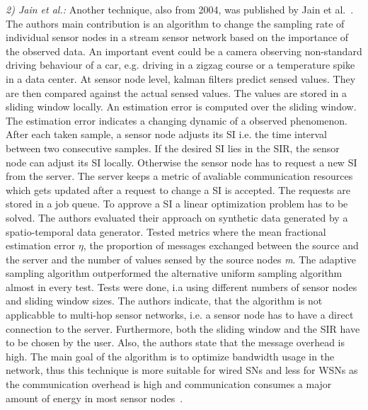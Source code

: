 \textit{2) Jain et al.:}
Another technique, also from 2004, was published by Jain et
al.~\cite{jain2004adaptive}. The authors main contribution is an algorithm to
change the sampling rate of individual sensor nodes in a stream sensor network
based on the importance of the observed data. An important event could be a
camera observing non-standard driving behaviour of a car, e.g. driving in a
zigzag course or a temperature spike in a data center. At sensor node level,
kalman filters predict sensed values. They are then compared against the actual
sensed values. The values are stored in a sliding window locally. An estimation
error is computed over the sliding window. The estimation error indicates a
changing dynamic of a observed phenomenon. After each taken sample, a sensor
node adjusts its \ac{SI} i.e. the time interval between two consecutive
samples. If the desired \ac{SI} lies in the \ac{SIR}, the sensor node can
adjust its \ac{SI} locally. Otherwise the sensor node has to request a new
\ac{SI} from the server. The server keeps a metric of avaliable communication
resources which gets updated after a request to change a \ac{SI} is accepted.
The requests are stored in a job queue. To approve a \ac{SI} a linear
optimization problem has to be solved. The authors evaluated their approach on
synthetic data generated by a spatio-temporal data generator. Tested metrics
where the mean fractional estimation error $ \eta $, the proportion of messages
exchanged between the source and the server and the number of values sensed by
the source nodes \textit{m}. The adaptive sampling algorithm outperformed the
alternative uniform sampling algorithm almost in every test. Tests were done,
i.a using different numbers of sensor nodes and sliding window sizes. The
authors indicate, that the algorithm is not applicabble to multi-hop sensor
networks, i.e. a sensor node has to have a direct connection to the server.
Furthermore, both the sliding window and the \ac{SIR} have to be chosen by the
user. Also, the authors state that the message overhead is high. The main goal
of the algorithm is to optimize bandwidth usage in the network, thus this
technique is more suitable for wired \acp{SN} and less for \acp{WSN} as the
communication overhead is high and communication consumes a major amount of
energy in most sensor nodes~\cite{raghunathan2002energy}.

\par

